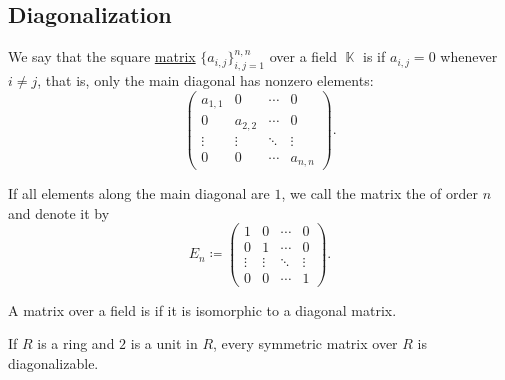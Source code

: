 \subsection{Diagonalization}\label{subsec:diagonalization}

\begin{definition}\label{def:diagonal_matrix}
  We say that the square \hyperref[def:array/matrix]{matrix} \( \{ a_{i,j} \}_{i,j=1}^{n,n} \) over a field \( \BbbK \) is  if \( a_{i,j} = 0 \) whenever \( i \neq j \), that is, only the main diagonal has nonzero elements:
  \begin{equation*}
    \begin{pmatrix}
      a_{1,1} & 0       & \cdots & 0       \\
      0       & a_{2,2} & \cdots & 0       \\
      \vdots  & \vdots  & \ddots & \vdots  \\
      0       & 0       & \cdots & a_{n,n}
    \end{pmatrix}.
  \end{equation*}

  If all elements along the main diagonal are \( 1 \), we call the matrix the  of order \( n \) and denote it by
  \begin{equation*}
    E_n \coloneqq
    \begin{pmatrix}
      1      & 0      & \cdots & 0      \\
      0      & 1      & \cdots & 0      \\
      \vdots & \vdots & \ddots & \vdots \\
      0      & 0      & \cdots & 1
    \end{pmatrix}.
  \end{equation*}
\end{definition}

\begin{definition}\label{def:diagonalizable_matrix}
  A matrix over a field is  if it is isomorphic to a diagonal matrix.
\end{definition}

\begin{theorem}\label{def:spectral_theorem_for_matrices}
  If \( R \) is a ring and \( 2 \) is a unit in \( R \), every symmetric matrix over \( R \) is diagonalizable.
\end{theorem}
